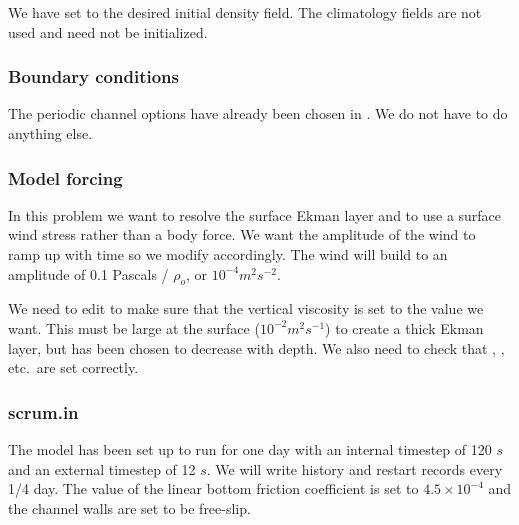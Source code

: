 We have set  to the desired initial density field.
The climatology fields are not used and need not be initialized.

\subsubsection{Boundary conditions}
The periodic channel options have already been chosen in
.  We do not have to do anything else.

\subsubsection{Model forcing}
In this problem we want to resolve the
surface Ekman layer and to use a surface wind stress rather than a body
force.  We want the amplitude of the wind to ramp up with time so we
modify  accordingly.
The wind will build to an amplitude of 0.1 Pascals / $\rho_o$,
or $10^{-4} m^2 s^{-2}$.

We need to edit  to make sure that the
vertical viscosity  is set to the value we want.  This
must be large at the surface ($10^{-2} m^2 s^{-1}$) to create a thick
Ekman layer, but has been chosen to decrease with depth.  We also need
to check that , , etc.\ are
set correctly.

\subsubsection{scrum.in}
The model has been set up to run for one day with an internal timestep
of 120 $s$ and an external timestep of 12 $s$.  We will write history
and restart records every 1/4 day.  The value of the linear bottom
friction coefficient  is set to $4.5 \times 10^{-4}$ and the
channel walls are set to be free-slip.

